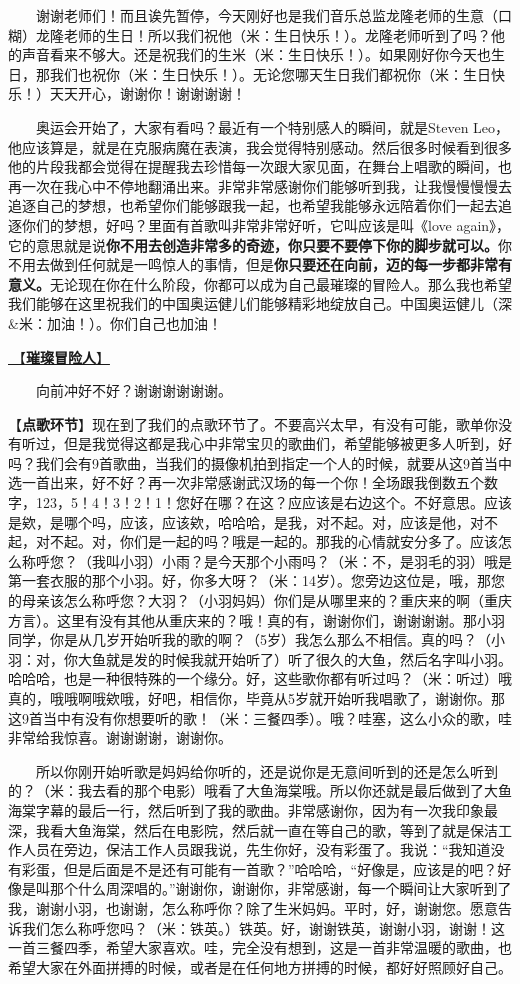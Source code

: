 \documentclass[]{ctexbook}
\begin{document}
  谢谢老师们！而且诶先暂停，今天刚好也是我们音乐总监龙隆老师的生意（口糊）龙隆老师的生日！所以我们祝他（米：生日快乐！）。龙隆老师听到了吗？他的声音看来不够大。还是祝我们的生米（米：生日快乐！）。如果刚好你今天也生日，那我们也祝你（米：生日快乐！）。无论您哪天生日我们都祝你（米：生日快乐！）天天开心，谢谢你！谢谢谢谢！

  奥运会开始了，大家有看吗？最近有一个特别感人的瞬间，就是Steven Leo，他应该算是，就是在克服病魔在表演，我会觉得特别感动。然后很多时候看到很多他的片段我都会觉得在提醒我去珍惜每一次跟大家见面，在舞台上唱歌的瞬间，也再一次在我心中不停地翻涌出来。非常非常感谢你们能够听到我，让我慢慢慢慢去追逐自己的梦想，也希望你们能够跟我一起，也希望我能够永远陪着你们一起去追逐你们的梦想，好吗？里面有首歌叫非常非常好听，它叫应该是叫《love again》，它的意思就是说\textbf{你不用去创造非常多的奇迹，你只要不要停下你的脚步就可以。}你不用去做到任何就是一鸣惊人的事情，但是\textbf{你只要还在向前，迈的每一步都非常有意义。}无论现在你在什么阶段，你都可以成为自己最璀璨的冒险人。那么我也希望我们能够在这里祝我们的中国奥运健儿们能够精彩地绽放自己。中国奥运健儿（深\&米：加油！）。你们自己也加油！

\hyperref[adventurers]{🎵【\textbf{璀璨冒险人}】}

  向前冲好不好？谢谢谢谢谢谢。

【\textbf{点歌环节}】现在到了我们的点歌环节了。不要高兴太早，有没有可能，歌单你没有听过，但是我觉得这都是我心中非常宝贝的歌曲们，希望能够被更多人听到，好吗？我们会有9首歌曲，当我们的摄像机拍到指定一个人的时候，就要从这9首当中选一首出来，好不好？再一次非常感谢武汉场的每一个你！全场跟我倒数五个数字，123，5！4！3！2！1！您好在哪？在这？应应该是右边这个。不好意思。应该是欸，是哪个吗，应该，应该欸，哈哈哈，是我，对不起。对，应该是他，对不起，对不起。对，你们是一起的吗？哦是一起的。那我的心情就安分多了。应该怎么称呼您？（我叫小羽）小雨？是今天那个小雨吗？（米：不，是羽毛的羽）哦是第一套衣服的那个小羽。好，你多大呀？（米：14岁）。您旁边这位是，哦，那您的母亲该怎么称呼您？大羽？（小羽妈妈）你们是从哪里来的？重庆来的啊（重庆方言）。这里有没有其他从重庆来的？哦！真的有，谢谢你们，谢谢谢谢。那小羽同学，你是从几岁开始听我的歌的啊？（5岁）我怎么那么不相信。真的吗？（小羽：对，你大鱼就是发的时候我就开始听了）听了很久的大鱼，然后名字叫小羽。哈哈哈，也是一种很特殊的一个缘分。好，这些歌你都有听过吗？（米：听过）哦真的，哦哦啊哦欸哦，好吧，相信你，毕竟从5岁就开始听我唱歌了，谢谢你。那这9首当中有没有你想要听的歌！（米：三餐四季）。哦？哇塞，这么小众的歌，哇非常给我惊喜。谢谢谢谢，谢谢你。

  所以你刚开始听歌是妈妈给你听的，还是说你是无意间听到的还是怎么听到的？（米：我去看的那个电影）哦看了大鱼海棠哦。所以你还就是最后做到了大鱼海棠字幕的最后一行，然后听到了我的歌曲。非常感谢你，因为有一次我印象最深，我看大鱼海棠，然后在电影院，然后就一直在等自己的歌，等到了就是保洁工作人员在旁边，保洁工作人员跟我说，先生你好，没有彩蛋了。我说：``我知道没有彩蛋，但是后面是不是还有可能有一首歌？''哈哈哈，``好像是，应该是的吧？好像是叫那个什么周深唱的。''谢谢你，谢谢你，非常感谢，每一个瞬间让大家听到了我，谢谢小羽，也谢谢，怎么称呼你？除了生米妈妈。平时，好，谢谢您。愿意告诉我们怎么称呼您吗？（米：铁英。）铁英。好，谢谢铁英，谢谢小羽，谢谢！这一首三餐四季，希望大家喜欢。哇，完全没有想到，这是一首非常温暖的歌曲，也希望大家在外面拼搏的时候，或者是在任何地方拼搏的时候，都好好照顾好自己。
\end{document}
